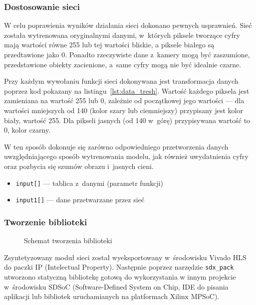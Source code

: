 \documentclass[12pt, oneside, a4paper]{article}
\begin{document}
\subsubsection{Dostosowanie sieci}
W celu poprawienia wyników działania sieci dokonano pewnych usprawnień.
Sieć została wytrenowana oryginalnymi danymi, w~których piksele tworzące
cyfry mają wartości równe 255 lub tej wartości bliskie,
a piksele białego są przedtawione jako 0.
Ponadto rzeczywiste dane z~kamery mogą być zaszumione,
przedstawione obiekty zacienione, a~same cyfry mogą nie być idealnie czarne.

Przy każdym wywołaniu funkcji sieci dokonywana jest transformacja
danych poprzez kod pokazany na listingu~\ref{lst:data_tresh}.
Wartość każdego piksela jest zamieniana na wartość 255 lub 0, zależnie
od początkowej jego wartości --- dla wartości mniejszych od 140
(kolor szary lub ciemniejszy) przypisany jest kolor biały, wartość 255.
Dla pikseli jasnych (od 140 w~górę) przypisywana wartość to 0, kolor czarny.

W ten sposób dokonuje się zarówno odpowiedniego przetworzenia danych
uwzględniającego sposób wytrenowania modelu, jak również uwydatnienia
cyfry oraz pozbycia się szumów obrazu i~jasnych cieni.

\hspace{-1cm}
\begin{minipage}{\linewidth}

\begin{itemize}
  \setlength{\itemindent}{3em}
  \item \lstinline[style=hls]{input[]} --- tablica z~danymi (parametr funkcji)
  \item \lstinline[style=hls]{input1[]} --- dane przetwarzane przez sieć
\end{itemize}
\end{minipage}

\subsubsection{Tworzenie biblioteki}\label{section:create_library}
\begin{figure}[h]
  \centering
  
  \caption{Schemat tworzenia biblioteki}\label{fig:ccall}
\end{figure}
Zsyntetyzowany moduł sieci został wyeksportowany w~środowisku Vivado HLS
do paczki IP (Intelectual Property). Następnie poprzez narzędzie
\lstinline{sdx_pack} utworzono statyczną bibliotekę gotową do wykorzystania
w innym projekcie w~środowisku SDSoC (Software-Defined System on Chip,
IDE do pisania aplikacji lub bibliotek uruchamianych na platformach
Xilinx MPSoC).
\end{document}
